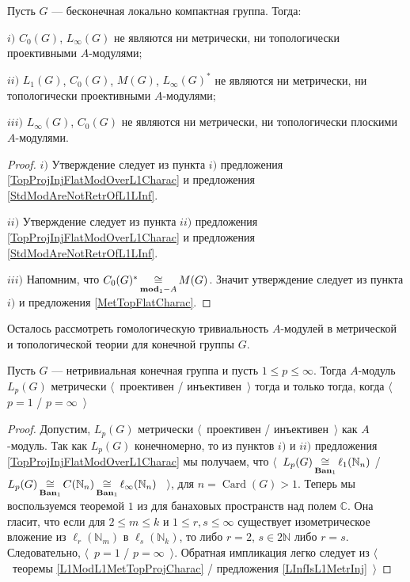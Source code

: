 \begin{proposition}\label{StdModAreNotL1MGMetTopProj} Пусть $G$ --- бесконечная локально компактная группа. Тогда:

$i)$ $C_0(G)$, $L_\infty(G)$ не являются ни метрически, ни топологически проективными $A$-модулями;

$ii)$ $L_1(G)$, $C_0(G)$, $M(G)$, $L_\infty(G)^*$ не являются ни метрически, ни топологически проективными $A$-модулями;

$iii)$ $L_\infty(G)$, $C_0(G)$ не являются ни метрически, ни топологически плоскими $A$-модулями.
\end{proposition}
\begin{proof} $i)$ Утверждение следует из пункта $i)$ предложения \ref{TopProjInjFlatModOverL1Charac} и предложения  \ref{StdModAreNotRetrOfL1LInf}.

$ii)$ Утверждение следует из пункта $ii)$ предложения \ref{TopProjInjFlatModOverL1Charac} и предложения \ref{StdModAreNotRetrOfL1LInf}.

$iii)$ Напомним, что $C_0(G)^*\mathop{\mathbin{\cong}}\limits_{\mathbf{mod}_1-A}M(G)$. Значит утверждение следует из пункта $i)$ и предложения \ref{MetTopFlatCharac}.
\end{proof}

Осталось рассмотреть гомологическую тривиальность $A$-модулей в метрической и топологической теории для конечной группы $G$.

\begin{proposition}\label{LpFinGrL1MGMetrInjProjCharac} Пусть $G$ --- нетривиальная конечная группа и пусть $1\leq p\leq \infty$. Тогда $A$-модуль $L_p(G)$ метрически $\langle$~проективен / инъективен~$\rangle$ тогда и только тогда, когда $\langle$~$p=1$ / $p=\infty$~$\rangle$
\end{proposition}
\begin{proof} Допустим, $L_p(G)$ метрически $\langle$~проективен / инъективен~$\rangle$ как $A$-модуль. Так как $L_p(G)$ конечномерно, то из пунктов $i)$ и $ii)$ предложения \ref{TopProjInjFlatModOverL1Charac} мы получаем, что $\langle$~$L_p(G)\mathop{\mathbin{\cong}}\limits_{\mathbf{Ban}_1}\ell_1(\mathbb{N}_n)$ / $L_p(G)\mathop{\mathbin{\cong}}\limits_{\mathbf{Ban}_1}C(\mathbb{N}_n)\mathop{\mathbin{\cong}}\limits_{\mathbf{Ban}_1}\ell_\infty(\mathbb{N}_n)$ ~$\rangle$, для $n=\operatorname{Card}(G)>1$. Теперь мы воспользуемся теоремой $1$ из \cite{LyubIsomEmdbFinDimLp} для банаховых пространств над полем $\mathbb{C}$. Она гласит, что если для $2\leq m\leq k$ и $1\leq r,s\leq \infty$ существует изометрическое вложение из $\ell_r(\mathbb{N}_m)$ в $\ell_s(\mathbb{N}_k)$, то либо $r=2$, $s\in 2\mathbb{N}$ либо $r=s$. Следовательно, $\langle$~$p=1$ / $p=\infty$~$\rangle$. Обратная импликация легко следует из $\langle$~теоремы \ref{L1ModL1MetTopProjCharac} / предложения \ref{LInfIsL1MetrInj}~$\rangle$
\end{proof}

